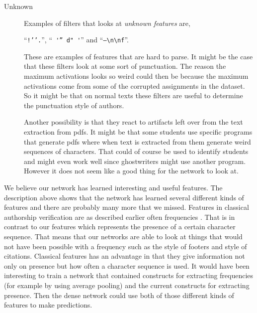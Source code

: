 \begin{description}
    \item[Unknown]

        Examples of filters that looks at \textit{unknown features} are,

        ``\verb|!’’.|'', ``\verb| '” d" '|'' and ``\verb|–\n\nf|''.

        These are examples of features that are hard to parse. It might be
        the case that these filters look at some sort of punctuation. The
        reason the maximum activations looks so weird could then be because the
        maximum activations come from some of the corrupted assignments in the
        dataset. So it might be that on normal texts these filters are useful to
        determine the punctuation style of authors.

        Another possibility is that they react to artifacts left over from the
        text extraction from pdfs. It might be that some students use specific
        programs that generate pdfs where when text is extracted from them
        generate weird sequences of characters. That could of course be used to
        identify students and might even work well since ghostwriters might use
        another program. However it does not seem like a good thing for the
        network to look at.

\end{description}

We believe our network has learned interesting and useful features. The
description above shows that the network has learned several different kinds
of features and there are probably many more that we missed. Features in
classical authorship verification are as described earlier often frequencies
\citep{stamatos2009}. That is in contrast to our features which represents the
presence of a certain character sequence. That means that our networks are able
to look at things that would not have been possible with a frequency such as the
style of footers and style of citations. Classical features has an advantage
in that they give information not only on presence but how often a character
sequence is used. It would have been interesting to train a network that
contained constructs for extracting frequencies (for example by using average
pooling) and the current constructs for extracting presence. Then the dense
network could use both of those different kinds of features to make predictions.
